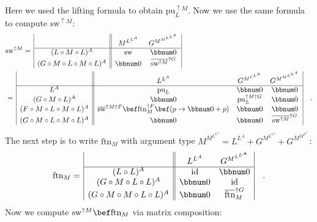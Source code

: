 Here we used the lifting formula to obtain $\text{pu}_{L}^{\uparrow M}$.
Now we use the same formula to compute $\text{sw}^{\uparrow M}$:
\begin{align*}
 & \text{sw}^{\uparrow M}=\,\begin{array}{|c||cc|}
 & M^{L^{L^{A}}} & G^{M^{M^{L^{L^{A}}}}}\\
\hline (L\circ M\circ L)^{A} & \text{sw} & \bbnum 0\\
(G\circ M\circ L\circ M\circ L)^{A} & \bbnum 0 & \overline{\text{sw}^{\uparrow M}}^{\uparrow G}
\end{array}\\
 & =\,\begin{array}{|c||ccc|}
 & L^{L^{A}} & G^{M^{L^{L^{A}}}} & G^{M^{M^{L^{L^{A}}}}}\\
\hline L^{A} & \text{pu}_{L} & \bbnum 0 & \bbnum 0\\
(G\circ M\circ L)^{A} & \bbnum 0 & \text{pu}_{L}^{\uparrow M\uparrow G} & \bbnum 0\\
(F\circ M\circ L\circ M\circ L)^{A} & \overline{\text{sw}}^{\uparrow M\uparrow F}\bef\text{ftn}_{M}^{\uparrow F}\bef(p\rightarrow\bbnum 0+p) & \bbnum 0 & \bbnum 0\\
(G\circ M\circ L\circ M\circ L)^{A} & \bbnum 0 & \bbnum 0 & \overline{\text{sw}^{\uparrow M}}^{\uparrow G}
\end{array}\quad.
\end{align*}
The next step is to write $\text{ftn}_{M}$ with argument type $M^{M^{L^{L^{A}}}}=L^{L^{A}}+G^{M^{L^{L^{A}}}}+G^{M^{M^{L^{L^{A}}}}}$:
\[
\text{ftn}_{M}=\,\begin{array}{|c||cc|}
 & L^{L^{A}} & G^{M^{L^{L^{A}}}}\\
\hline (L\circ L)^{A} & \text{id} & \bbnum 0\\
(G\circ M\circ L\circ L)^{A} & \bbnum 0 & \text{id}\\
(G\circ M\circ M\circ L\circ L)^{A} & \bbnum 0 & \overline{\text{ftn}}_{M}^{\uparrow G}
\end{array}\quad.
\]
Now we compute $\text{sw}^{\uparrow M}\bef\text{ftn}_{M}$ via matrix
composition:
